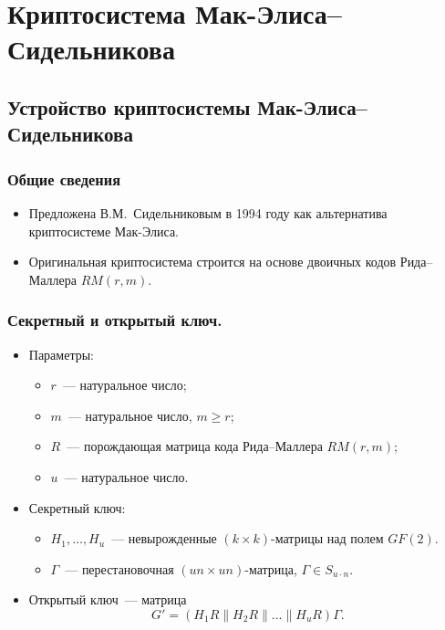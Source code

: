 {%
\section{Криптосистема Мак-Элиса--Сидельникова }

\subsection[Устройство]{Устройство криптосистемы Мак-Элиса--Сидельникова}

\begin{frame}
  \frametitle{Общие сведения}
\begin{itemize}
  \item Предложена В.М.~Сидельниковым в 1994 году как альтернатива криптосистеме Мак-Элиса.
  \pause
  \item Оригинальная криптосистема строится на основе двоичных кодов Рида--Маллера $RM(r,m)$.
  \end{itemize}

\end{frame}

\begin{frame}
  \frametitle{Секретный и открытый ключ.}
\begin{itemize}
  \item Параметры:
  \begin{itemize}
    \item
      $r$~--- натуральное число;
    \item
      $m$~--- натуральное число, $m\geqslant r$;
   \item $R$~--- порождающая матрица кода Рида--Маллера $RM(r,m)$;
   \item $u$~--- натуральное число.
    \end{itemize}
    \pause
  \item Секретный ключ:
    \begin{itemize}
    \item
      $H_1,\ldots,H_u$~--- невырожденные $(k\times k)$-матрицы над полем $GF(2)$.
    \item
      $\Gamma$~--- перестановочная $(un\times un)$-матрица, $\Gamma\in S_{u\cdot n}$.
    \end{itemize}
    \pause
  \item
    Открытый ключ~--- матрица
    $$G'=(H_1R\|H_2R\|\ldots\|H_uR)\Gamma.$$
  \end{itemize}

\end{frame}


}
